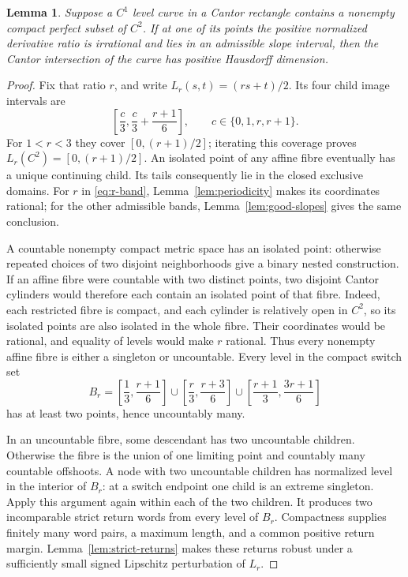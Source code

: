 \documentclass[11pt,a4paper]{amsart}
\numberwithin{equation}{section}
\newtheorem{lemma}[theorem]{Lemma}
\theoremstyle{definition}
\begin{document}
\begin{lemma}\label{lem:irrational-tangent}
Suppose a \(C^1\) level curve in a Cantor rectangle contains a
nonempty compact perfect subset of \(C^2\).
If at one of its points the positive normalized derivative ratio
is irrational and lies in an admissible slope interval, then
the Cantor intersection of the curve has positive Hausdorff dimension.
\end{lemma}
\begin{proof}
Fix that ratio \(r\), and write \(L_r(s,t)=(rs+t)/2\).
Its four child image intervals are
\[
\left[\frac c3,\frac c3+\frac{r+1}{6}\right],
\qquad c\in\{0,1,r,r+1\}.
\]
For \(1<r<3\) they cover \([0,(r+1)/2]\); iterating this
coverage proves \(L_r(C^2)=[0,(r+1)/2]\).
An isolated point of any affine fibre eventually has a unique
continuing child. Its tails consequently lie in the closed
exclusive domains. For \(r\) in \eqref{eq:r-band},
Lemma~\ref{lem:periodicity} makes its coordinates rational;
for the other admissible bands, Lemma~\ref{lem:good-slopes}
gives the same conclusion.

A countable nonempty compact metric space has an isolated point:
otherwise repeated choices of two disjoint neighborhoods give
a binary nested construction. If an affine fibre were countable
with two distinct points, two disjoint Cantor cylinders would
therefore each contain an isolated point of that fibre.
Indeed, each restricted fibre is compact, and each cylinder is
relatively open in \(C^2\), so its isolated points are also isolated
in the whole fibre.
Their coordinates would be rational, and equality of levels
would make \(r\) rational. Thus every nonempty affine fibre is
either a singleton or uncountable. Every level in the compact
switch set
\[
B_r=
\left[\frac13,\frac{r+1}{6}\right]\cup
\left[\frac r3,\frac{r+3}{6}\right]\cup
\left[\frac{r+1}{3},\frac{3r+1}{6}\right]
\]
has at least two points, hence uncountably many.

In an uncountable fibre, some descendant has two uncountable
children. Otherwise the fibre is the union of one limiting point
and countably many countable offshoots. A node with two
uncountable children has normalized level in the interior of
\(B_r\): at a switch endpoint one child is an extreme singleton.
Apply this argument again within each of the two children.
It produces two incomparable strict return words from every
level of \(B_r\). Compactness supplies finitely many word pairs,
a maximum length, and a common positive return margin.
Lemma~\ref{lem:strict-returns} makes these returns robust under
a sufficiently small signed Lipschitz perturbation of \(L_r\).


\end{proof}
\end{document}
